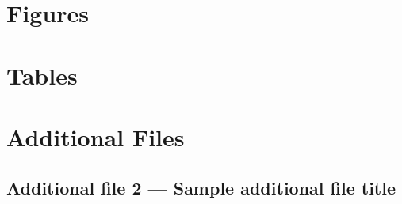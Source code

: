\documentclass[twocolumn]{bmcart}%
\begin{document}
\begin{backmatter}


\section*{Figures}
 

\section*{Tables}


\section*{Additional Files}

  \subsection*{Additional file 2 --- Sample additional file title}


\end{backmatter}
\end{document}
